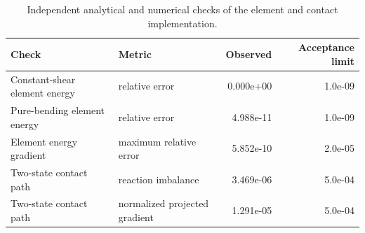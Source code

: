 \begin{table}[t]
\centering\small
\caption{Independent analytical and numerical checks of the element and contact implementation.}
\label{tab:formulation_verification}
\begin{tabular}{llrr}
\toprule
Check & Metric & Observed & Acceptance limit \\
\midrule
Constant-shear element energy & relative error & 0.000e+00 & 1.0e-09 \\
Pure-bending element energy & relative error & 4.988e-11 & 1.0e-09 \\
Element energy gradient & maximum relative error & 5.852e-10 & 2.0e-05 \\
Two-state contact path & reaction imbalance & 3.469e-06 & 5.0e-04 \\
Two-state contact path & normalized projected gradient & 1.291e-05 & 5.0e-04 \\
\bottomrule
\end{tabular}
\end{table}
